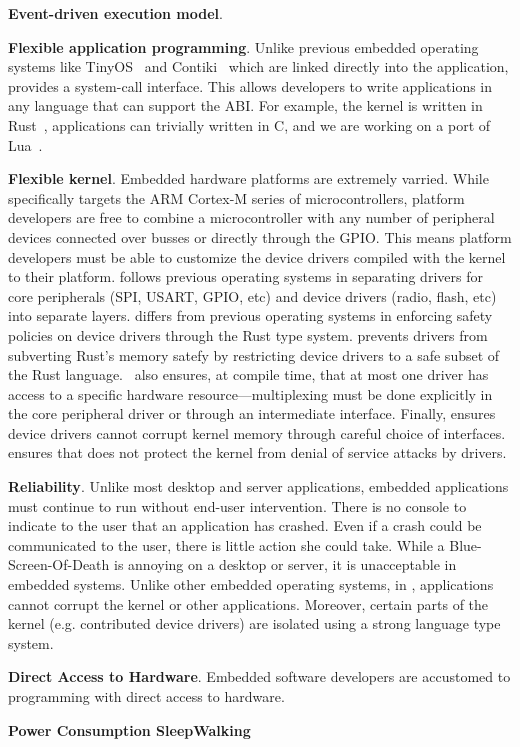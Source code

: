 {\bf Event-driven execution model}.

{\bf Flexible application programming}. Unlike previous embedded operating
systems like TinyOS~\cite{tinyos} and Contiki~\cite{contiki} which are linked
directly into the application, \name provides a system-call interface. This
allows developers to write applications in any language that can support the
ABI. For example, the \name kernel is written in Rust~\cite{rust}, applications
can trivially written in C, and we are working on a port of Lua~\cite{lua}.

{\bf Flexible kernel}. Embedded hardware platforms are extremely varried. While
\name specifically targets the ARM Cortex-M series of microcontrollers, platform
developers are free to combine a microcontroller with any number of peripheral
devices connected over busses or directly through the GPIO. This means platform
developers must be able to customize the device drivers compiled with the kernel
to their platform. \name follows previous operating systems in separating
drivers for core peripherals (SPI, USART, GPIO, etc) and device drivers (radio,
flash, etc) into separate layers. \name differs from previous operating systems
in enforcing safety policies on device drivers through the Rust type system.
\name prevents drivers from subverting Rust's memory satefy by restricting
device drivers to a safe subset of the Rust language.~ \name
also ensures, at compile time, that at most one driver has access to a specific
hardware resource---multiplexing must be done explicitly in the core peripheral
driver or through an intermediate interface. Finally, \name ensures device
drivers cannot corrupt kernel memory through careful choice of interfaces. \name
ensures that \name does not protect the kernel from denial of service attacks by
drivers.

{\bf Reliability}. Unlike most desktop and server applications, embedded
applications must continue to run without end-user intervention. There is no
console to indicate to the user that an application has crashed. Even if a crash
could be communicated to the user, there is little action she could take. While
a Blue-Screen-Of-Death is annoying on a desktop or server, it is unacceptable in
embedded systems. Unlike other embedded operating systems, in \name,
applications cannot corrupt the kernel or other applications. Moreover, certain
parts of the kernel (e.g. contributed device drivers) are isolated using
a strong language type system.

{\bf Direct Access to Hardware}. Embedded software developers are accustomed to
programming with direct access to hardware. 

{\bf Power Consumption SleepWalking}
